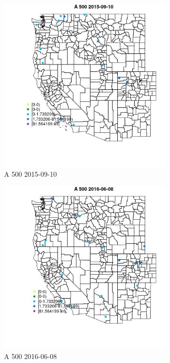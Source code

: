 \begin{figure} 
\centering  
\includegraphics[width=0.77\textwidth]{Code_Outputs/Report_ML_input_PM25_Step4_part_e_de_duplicated_aves_MapObsA_5002015-09-10.jpg} 
\caption{\label{fig:Report_ML_input_PM25_Step4_part_e_de_duplicated_avesMapObsA_5002015-09-10}A 500 2015-09-10} 
\end{figure} 
 

\begin{figure} 
\centering  
\includegraphics[width=0.77\textwidth]{Code_Outputs/Report_ML_input_PM25_Step4_part_e_de_duplicated_aves_MapObsA_5002016-06-08.jpg} 
\caption{\label{fig:Report_ML_input_PM25_Step4_part_e_de_duplicated_avesMapObsA_5002016-06-08}A 500 2016-06-08} 
\end{figure} 
 

